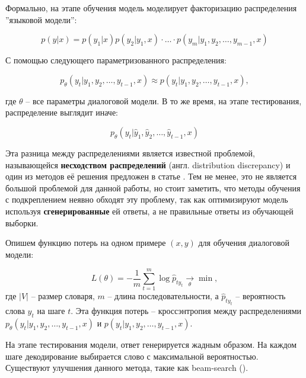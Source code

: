 \documentclass[12pt,a4paper]{amsart}
\begin{document}
Формально, на этапе обучения модель моделирует факторизацию распределения ''языковой модели'':

\begin{equation} \label{eq:seq2seq-pdistr-train}
p(y | x) = p(y_1 | x) p(y_2 | y_1, x) \cdot \dots \cdot p(y_m | y_1, y_2, \dots, y_{m-1}, x)
\end{equation}

С помощью следующего параметризованного распределения:

\begin{equation} \label{eq:seq2seq-pdistr-train-2}
p_{\theta}(y_t | y_1, y_2, \dots, y_{t-1}, x) \approx p(y_t|y_1, y_2, \dots, y_{t-1}, x),
\end{equation}

где $\theta$ -- все параметры диалоговой модели. В то же время, на этапе тестирования, распределение выглядит иначе:

\begin{equation} \label{eq:seq2seq-pdistr-test}
p_{\theta}(y_t | \hat{y}_1, \hat{y}_2, \dots, \hat{y}_{t-1}, x)
\end{equation}

Эта разница между распределениями является известной проблемой, называющейся \textbf{несходством распределений} (англ. distribution discrepancy) и один из методов её решения предложен в статье \cite{DBLP:journals/corr/BengioVJS15}. Тем не менее, это не является большой проблемой для данной работы, но стоит заметить, что методы обучения с подкреплением неявно обходят эту проблему, так как оптимизируют модель используя \textbf{сгенерированные} ей ответы, а не правильные ответы из обучающей выборки.

Опишем функцию потерь на одном примере $(x, y)$ для обучения диалоговой модели:

\begin{equation} \label{crossentropy}
L(\theta) =  -\frac{1}{m}\sum_{t=1}^{m} \log\hat{p}_{ty_t} \xrightarrow[\theta]{} \min,
\end{equation}
где $|V|$ -- размер словаря, $m$ -- длина последовательности, а $\hat{p}_{ty_t}$ -- вероятность слова $y_t$ на шаге $t$. Эта функция потерь -- кроссэнтропия между распределениями $p_{\theta}(y_t | y_1, y_2, \dots, y_{t-1}, x)$ и $p(y_t|y_1, y_2, \dots, y_{t-1}, x)$.

На этапе тестирования модели, ответ генерируется жадным образом. На каждом шаге декодирование выбирается слово с максимальной вероятностью. Существуют улучшения данного метода, такие как beam-search (\cite{DBLP:journals/corr/abs-0907-0809}).
\end{document}
